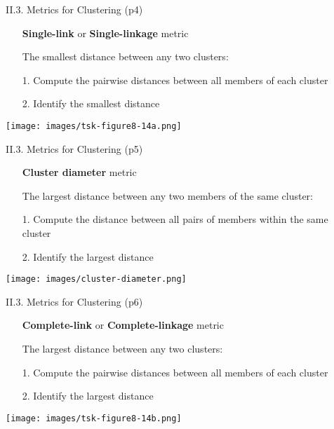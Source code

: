 \documentclass[handout]{beamer}
\newcommand{\stronger}[1]{\textbf{\color{purple} #1}}
\begin{document}
\begin{frame}{II.3. Metrics for Clustering (p4)}
\begin{itemize}
\item[] \stronger{Single-link} or \stronger{Single-linkage} metric
\item[] The smallest distance between any two clusters:
\item[1.] Compute the pairwise distances between all members of each cluster
\item[2.] Identify the smallest distance
\end{itemize}
\begin{center}
\texttt{[image: images/tsk-figure8-14a.png]}\\
\cite[Figure 8.14a]{tan-et-al:2005}
\end{center}
\end{frame}
\begin{frame}{II.3. Metrics for Clustering (p5)}
\begin{itemize}
\item[] \stronger{Cluster diameter} metric
\item[] The largest distance between any two members of the same cluster:
\item[1.] Compute the distance between all pairs of members within the same cluster
\item[2.] Identify the largest distance
\end{itemize}
\begin{center}
\texttt{[image: images/cluster-diameter.png]}
\end{center}
\end{frame}
\begin{frame}{II.3. Metrics for Clustering (p6)}
\begin{itemize}
\item[] \stronger{Complete-link} or \stronger{Complete-linkage} metric
\item[] The largest distance between any two clusters:
\item[1.] Compute the pairwise distances between all members of each cluster
\item[2.] Identify the largest distance
\end{itemize}
\begin{center}
\texttt{[image: images/tsk-figure8-14b.png]} \\
\cite[Figure 8.14b]{tan-et-al:2005}
\end{center}
\end{frame}
\end{document}
